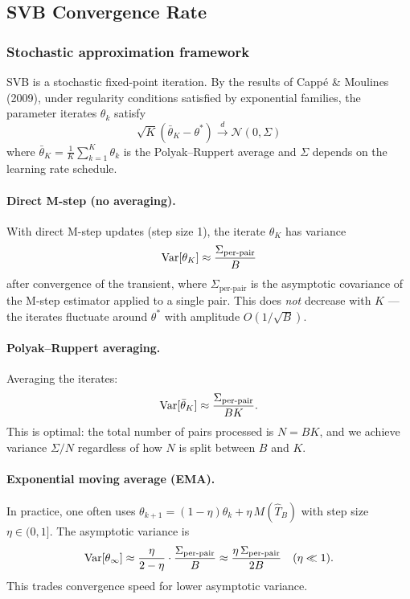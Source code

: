 \subsection{SVB Convergence Rate}

\subsubsection{Stochastic approximation framework}

SVB is a stochastic fixed-point iteration.
By the results of Capp\'e \& Moulines (2009), under regularity conditions
satisfied by exponential families, the parameter iterates $\theta_k$
satisfy
\begin{equation}\label{eq:clt}
\sqrt{K}(\bar\theta_K - \theta^*) \xrightarrow{d} \mathcal{N}(0, \Sigma)
\end{equation}
where $\bar\theta_K = \frac{1}{K}\sum_{k=1}^K \theta_k$ is the
Polyak--Ruppert average and $\Sigma$ depends on the learning rate schedule.

\paragraph{Direct M-step (no averaging).}
With direct M-step updates (step size 1), the iterate $\theta_K$ has
variance
\begin{equation}\label{eq:nonavg}
\mathrm{Var}[\theta_K] \approx \frac{\Sigma_{\text{per-pair}}}{B}
\end{equation}
after convergence of the transient, where $\Sigma_{\text{per-pair}}$
is the asymptotic covariance of the M-step estimator applied to a
single pair.
This does \emph{not} decrease with $K$ --- the iterates fluctuate
around $\theta^*$ with amplitude $O(1/\sqrt{B})$.

\paragraph{Polyak--Ruppert averaging.}
Averaging the iterates:
\begin{equation}\label{eq:avg}
\mathrm{Var}[\bar\theta_K] \approx \frac{\Sigma_{\text{per-pair}}}{BK}.
\end{equation}
This is optimal: the total number of pairs processed is $N = BK$,
and we achieve variance $\Sigma / N$ regardless of how $N$ is
split between $B$ and $K$.

\paragraph{Exponential moving average (EMA).}
In practice, one often uses $\theta_{k+1} = (1-\eta)\theta_k + \eta\, M(\hat T_B)$
with step size $\eta \in (0,1]$.
The asymptotic variance is
\[
\mathrm{Var}[\theta_\infty] \approx \frac{\eta}{2-\eta} \cdot
  \frac{\Sigma_{\text{per-pair}}}{B}
  \approx \frac{\eta\, \Sigma_{\text{per-pair}}}{2B}
  \quad (\eta \ll 1).
\]
This trades convergence speed for lower asymptotic variance.

